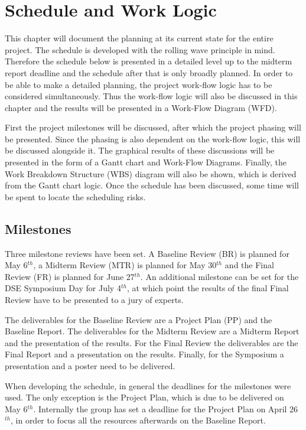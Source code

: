 \documentclass[a4paper]{report}
\begin{document}
\chapter{Schedule and Work Logic}
This chapter will document the planning at its current state for the entire project. The schedule is developed with the rolling wave principle in mind. Therefore the schedule below is presented in a detailed level up to the midterm report deadline and the schedule after that is only broadly planned. In order to be able to make a detailed planning, the project work-flow logic has to be considered simultaneously. Thus the work-flow logic will also be discussed in this chapter and the results will be presented in a Work-Flow Diagram (WFD). 

First the project milestones will be discussed, after which the project phasing will be presented. Since the phasing is also dependent on the work-flow logic, this will be discussed alongside it. The graphical results of these discussions will be presented in the form of a Gantt chart and Work-Flow Diagrams. Finally, the Work Breakdown Structure (WBS) diagram will also be shown, which is derived from the Gantt chart logic. Once the schedule has been discussed, some time will be spent to locate the scheduling risks.
\section{Milestones}
Three milestone reviews have been set. A Baseline Review (BR) is planned for May 6$^{th}$, a Midterm Review (MTR) is planned for May 30$^{th}$ and  the Final Review (FR) is planned for June 27$^{th}$. An additional milestone can be set for the DSE Symposium Day for July 4$^{th}$, at which point the results of the final Final Review have to be presented to a jury of experts. \newline

The deliverables for the Baseline Review are a Project Plan (PP) and the Baseline Report. The deliverables for the Midterm Review are a Midterm Report and the presentation of the results. For the Final Review the deliverables are the Final Report and a presentation on the results. Finally, for the Symposium a presentation and a poster need to be delivered. \newline

When developing the schedule, in general the deadlines for the milestones were used. The only exception is the Project Plan, which is due to be delivered on May 6$^{th}$. Internally the group has set a deadline for the Project Plan on April 26$^{th}$, in order to focus all the resources afterwards on the Baseline Report. 
\end{document}

